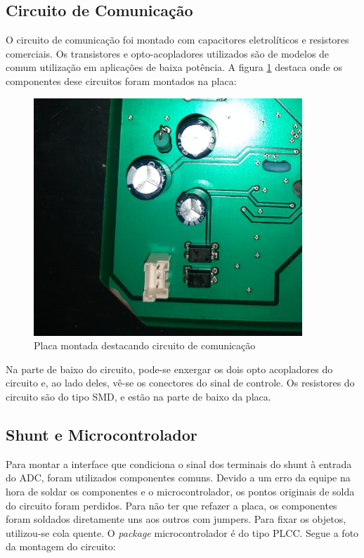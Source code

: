 \subsection{Circuito de Comunicação}
O circuito de comunicação foi montado com capacitores eletrolíticos e resistores comerciais. Os transistores e opto-acopladores utilizados são de modelos de comum utilização em aplicações de baixa potência. A figura \ref{fig:figura-montagem-comm} destaca onde os componentes dese circuitos foram montados na placa:

\begin{figure}[H]
    \centering
    \includegraphics[width=0.9\textwidth]{./dados/figuras/placa_comm.png}
    \caption{Placa montada destacando circuito de comunicação}
    \label{fig:figura-montagem-comm}
\end{figure}

Na parte de baixo do circuito, pode-se enxergar os dois opto acopladores do circuito e, ao lado deles, vê-se os conectores do sinal de controle. Os resistores do circuito são do tipo SMD, e estão na parte de baixo da placa.

\subsection{Shunt e Microcontrolador}
Para montar a interface que condiciona o sinal dos terminais do shunt à entrada do ADC, foram utilizados componentes comuns. Devido a um erro da equipe na hora de soldar os componentes e o microcontrolador, os pontos originais de solda do circuito foram perdidos. Para não ter que refazer a placa, os componentes foram soldados diretamente uns aos outros com jumpers. Para fixar os objetos, utilizou-se cola quente. O \textit{package} microcontrolador é do tipo PLCC. Segue a foto da montagem do circuito:

